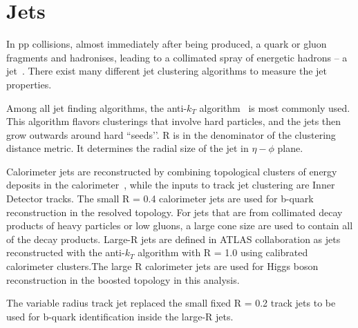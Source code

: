 \section{Jets}
\label{sec:jets}
\par In pp collisions, almost immediately after being produced, a quark or gluon fragments and hadronises, leading to a collimated spray of energetic hadrons -- 
a jet~\cite{Salam:2009jx}. There exist many different jet clustering algorithms to measure the jet properties. 
\par Among all jet finding algorithms, the anti-$k_T$ algorithm~\cite{Cacciari:2008gp} is most commonly used. This algorithm flavors clusterings that involve hard particles, 
and the jets then grow outwards around hard ``seeds’’. R is in the denominator of the clustering distance metric. It determines the radial size of the jet in $\eta-\phi$ plane.
\par Calorimeter jets are reconstructed by combining topological clusters of energy deposits in the calorimeter~\cite{Aad:2011he}, while the inputs to track jet clustering are Inner Detector tracks. 
The small R = 0.4 calorimeter jets are used for b-quark reconstruction in the resolved topology. For jets that are from collimated decay products of heavy particles or low \pt gluons, 
a large cone size are used to contain all of the decay products. Large-R jets are defined in ATLAS collaboration as jets reconstructed with the anti-$k_T$ algorithm with R = 1.0 using calibrated 
calorimeter clusters.The large R calorimeter jets are used for Higgs boson reconstruction in the boosted topology in this analysis.
\par The variable radius track jet replaced the small fixed R = 0.2 track jets to be used for b-quark identification inside the large-R jets.

